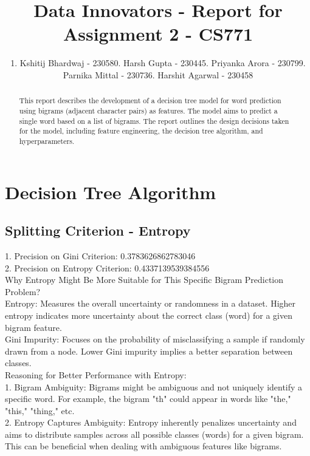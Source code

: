 \documentclass{article}
\title{Data Innovators - Report for Assignment 2 - CS771}
\author{%
  1. Kshitij Bhardwaj - 230580\AND
  2. Harsh Gupta - 230445\AND
  3. Priyanka Arora - 230799\AND
  4. Parnika Mittal - 230736\AND
  5. Harshit Agarwal - 230458\AND
}
\begin{document}
\maketitle

\begin{abstract}
  This report describes the development of a decision tree model for word prediction using bigrams (adjacent character pairs) as features. The model aims to predict a single word based on a list of bigrams. The report outlines the design decisions taken for the model, including feature engineering, the decision tree algorithm, and hyperparameters. 
  \end{abstract}
  
  \section{Decision Tree Algorithm}
  
  \subsection{Splitting Criterion - Entropy}
  1. Precision on Gini Criterion: 0.3783626862783046\\
  2. Precision on Entropy Criterion: 0.4337139539384556 \\

  Why Entropy Might Be More Suitable for This Specific Bigram Prediction Problem?\\

Entropy: Measures the overall uncertainty or randomness in a dataset. Higher entropy indicates more uncertainty about the correct class (word) for a given bigram feature.\\
Gini Impurity: Focuses on the probability of misclassifying a sample if randomly drawn from a node. Lower Gini impurity implies a better separation between classes.\\

Reasoning for Better Performance with Entropy:\\

1. Bigram Ambiguity: Bigrams might be ambiguous and not uniquely identify a specific word. For example, the bigram "th" could appear in words like "the," "this," "thing," etc.\\
2. Entropy Captures Ambiguity: Entropy inherently penalizes uncertainty and aims to distribute samples across all possible classes (words) for a given bigram. This can be beneficial when dealing with ambiguous features like bigrams.\\
\end{document}
